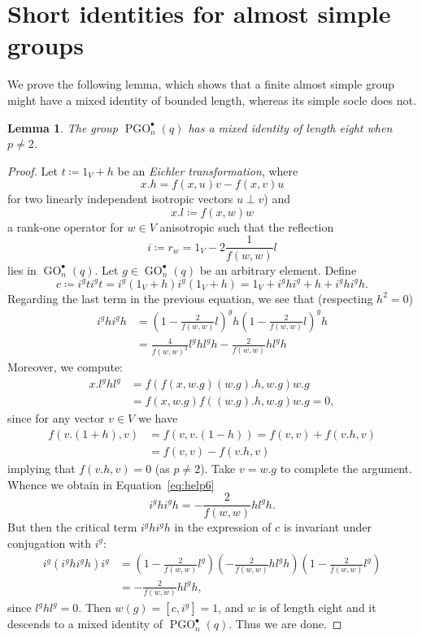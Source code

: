\documentclass[a4paper,12pt]{amsproc}
\DeclareMathOperator{\GO}{GO}%
\DeclareMathOperator{\PGO}{PGO}%
\theoremstyle{plain}
\newtheorem{lemma}[definition]{Lemma}
\theoremstyle{definition}
\begin{document}
\section{Short identities for almost simple groups}\label{sec:almost_simple_grps}

We prove the following lemma, which shows that a finite almost simple group might have a mixed identity of bounded length, whereas its simple socle does not.

\begin{lemma}
The group $\PGO_n^\bullet(q)$ has a mixed identity of length eight when $p\neq 2$.
\end{lemma}

\begin{proof}
Let $t\coloneqq 1_V+h$ be an \emph{Eichler transformation}, where 
$$
x.h=f(x,u)v-f(x,v)u
$$ 
for two linearly independent isotropic vectors $u\perp v$) and 
$$
x.l\coloneqq f(x,w)w
$$ 
a rank-one operator for $w\in V$ anisotropic such that the reflection 
$$
i\coloneqq r_w=1_V-2\frac{1}{f(w,w)}l
$$ 
lies in $\GO_n^\bullet(q)$. Let $g\in\GO_n^\bullet(q)$ be an arbitrary element. Define 
$$
c\coloneqq i^gti^gt=i^g(1_V+h)i^g(1_V+h)=1_V+i^ghi^g+h+i^ghi^gh.
$$
Regarding the last term in the previous equation, we see that (respecting $h^2=0$)
\begin{align}
i^ghi^gh&=\left(1-\frac{2}{f(w,w)}l\right)^gh\left(1-\frac{2}{f(w,w)}l\right)^gh\nonumber\\
&=\frac{4}{f(w,w)^2}l^ghl^gh-\frac{2}{f(w,w)}hl^gh\label{eq:help6}
\end{align}
Moreover, we compute:
\begin{align*}
x.l^ghl^g &=f(f(x,w.g)(w.g).h,w.g)w.g\\
&=f(x,w.g)f((w.g).h,w.g)w.g=0,
\end{align*}
since for any vector $v\in V$ we have 
\begin{align*}
f(v.(1+h),v)&=f(v,v.(1-h))=f(v,v)+f(v.h,v)\\&
=f(v,v)-f(v.h,v)
\end{align*}
implying that $f(v.h,v)=0$ (as $p\neq 2$). Take $v=w.g$ to complete the argument.
Whence we obtain in Equation~\eqref{eq:help6}
$$
i^ghi^gh=-\frac{2}{f(w,w)}hl^g h.
$$	
But then the critical term $i^ghi^gh$ in the expression of $c$ is invariant under conjugation with $i^g$:
\begin{align*}
i^g(i^ghi^gh)i^g&=\left(1-\frac{2}{f(w,w)}l^g\right)\left(-\frac{2}{f(w,w)}hl^g h\right)\left(1-\frac{2}{f(w,w)}l^g\right)\\
&=-\frac{2}{f(w,w)}hl^g h,
\end{align*}
since $l^ghl^g=0$. Then $w(g)=[c,i^g]=1$, and $w$ is of length eight and it descends to a mixed identity of $\PGO_n^\bullet(q)$. Thus we are done.
\end{proof}
\end{document}
